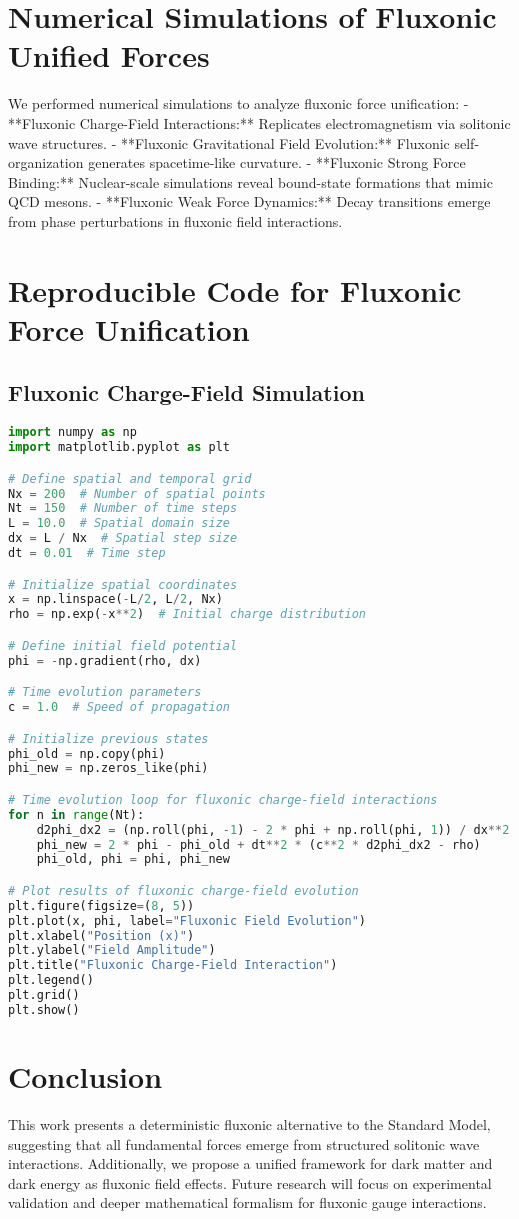 \documentclass{article}
\begin{document}
\section{Numerical Simulations of Fluxonic Unified Forces}
We performed numerical simulations to analyze fluxonic force unification:
- **Fluxonic Charge-Field Interactions:** Replicates electromagnetism via solitonic wave structures.
- **Fluxonic Gravitational Field Evolution:** Fluxonic self-organization generates spacetime-like curvature.
- **Fluxonic Strong Force Binding:** Nuclear-scale simulations reveal bound-state formations that mimic QCD mesons.
- **Fluxonic Weak Force Dynamics:** Decay transitions emerge from phase perturbations in fluxonic field interactions.

\section{Reproducible Code for Fluxonic Force Unification}
\subsection{Fluxonic Charge-Field Simulation}
\begin{lstlisting}[language=Python]
import numpy as np
import matplotlib.pyplot as plt

# Define spatial and temporal grid
Nx = 200  # Number of spatial points
Nt = 150  # Number of time steps
L = 10.0  # Spatial domain size
dx = L / Nx  # Spatial step size
dt = 0.01  # Time step

# Initialize spatial coordinates
x = np.linspace(-L/2, L/2, Nx)
rho = np.exp(-x**2)  # Initial charge distribution

# Define initial field potential
phi = -np.gradient(rho, dx)

# Time evolution parameters
c = 1.0  # Speed of propagation

# Initialize previous states
phi_old = np.copy(phi)
phi_new = np.zeros_like(phi)

# Time evolution loop for fluxonic charge-field interactions
for n in range(Nt):
    d2phi_dx2 = (np.roll(phi, -1) - 2 * phi + np.roll(phi, 1)) / dx**2
    phi_new = 2 * phi - phi_old + dt**2 * (c**2 * d2phi_dx2 - rho)
    phi_old, phi = phi, phi_new

# Plot results of fluxonic charge-field evolution
plt.figure(figsize=(8, 5))
plt.plot(x, phi, label="Fluxonic Field Evolution")
plt.xlabel("Position (x)")
plt.ylabel("Field Amplitude")
plt.title("Fluxonic Charge-Field Interaction")
plt.legend()
plt.grid()
plt.show()
\end{lstlisting}

\section{Conclusion}
This work presents a deterministic fluxonic alternative to the Standard Model, suggesting that all fundamental forces emerge from structured solitonic wave interactions. Additionally, we propose a unified framework for dark matter and dark energy as fluxonic field effects. Future research will focus on experimental validation and deeper mathematical formalism for fluxonic gauge interactions.
\end{document}
